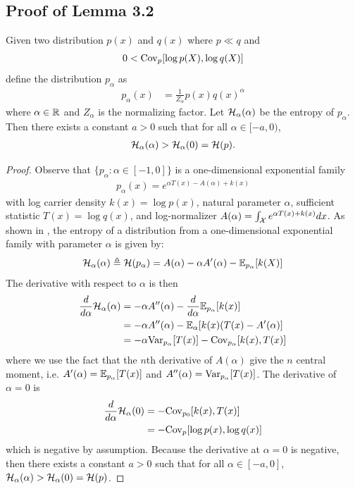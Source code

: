 \subsection{Proof of Lemma 3.2}\label{sec:covariance-proof}
\begin{lemma}\label{lemma:covariance-general}
Given two distribution $p(x)$ and $q(x)$ where $p \ll q$ and
\begin{align}
   0 < \mathrm{Cov}_p[\log p(X), \log q(X)]
\end{align}
define the distribution $p_\alpha$ as
\begin{align*}
    p_\alpha(x) &= \frac{1}{Z_\alpha} p(x) q(x)^\alpha
\end{align*}
where $\alpha \in \mathbb{R}$ and $Z_\alpha$ is the normalizing factor.
Let ${\mathcal{H}}_\alpha(\alpha)$ be the entropy of $p_\alpha$.
Then there exists a constant $a > 0$ such that for all $\alpha \in [-a, 0)$,
\begin{align}
    {\mathcal{H}}_\alpha(\alpha) > {\mathcal{H}}_\alpha(0) = {\mathcal{H}}(p).
\end{align}

\end{lemma}
\begin{proof}
Observe that $\{p_\alpha : \alpha \in [-1, 0]\}$ is a one-dimensional exponential family
\begin{align*}
    p_\alpha(x) = e^{\alpha T(x) - A(\alpha) + k(x)}
\end{align*}
with log carrier density $k(x) = \log p(x)$, natural parameter $\alpha$, sufficient statistic $T(x) = \log q(x)$, and log-normalizer $A(\alpha) = \int_{{\mathcal{X}}} e^{\alpha T(x) + k(x)}dx$.
As shown in \cite{nielsen2010entropies}, the entropy of a distribution from a one-dimensional exponential family with parameter $\alpha$ is given by:
\begin{align*}
    {\mathcal{H}}_\alpha(\alpha) \triangleq
    {\mathcal{H}}(p_\alpha)
    = A(\alpha) - \alpha A'(\alpha) - \mathbb{E}_{p_\alpha}[k(X)]
\end{align*}
The derivative with respect to $\alpha$ is then
\begin{align*}
    \frac{d}{d \alpha}{\mathcal{H}}_\alpha(\alpha)
        &= - \alpha A''(\alpha) - \frac{d}{d\alpha}\mathbb{E}_{p_\alpha}[k(x)]\\
        &= - \alpha A''(\alpha) - \mathbb{E}_\alpha[k(x)(T(x) - A'(\alpha)]\\
        &= - \alpha \mathrm{Var}_{p_\alpha}[T(x)] - \mathrm{Cov}_{p_\alpha}[k(x), T(x)]
\end{align*}
where we use the fact that the $n$th derivative of $A(\alpha)$ give the $n$ central moment, i.e. $A'(\alpha) = \mathbb{E}_{p_\alpha}[T(x)]$ and $A''(\alpha) = \mathrm{Var}_{p_\alpha}[T(x)]$.
The derivative of $\alpha = 0$ is
\begin{align*}
    \frac{d}{d \alpha}{\mathcal{H}}_\alpha(0)
        &= - \mathrm{Cov}_{p_0}[k(x), T(x)]\\
        &= - \mathrm{Cov}_p[\log p(x), \log q(x)]
\end{align*}
which is negative by assumption.
Because the derivative at $\alpha = 0$ is negative, then there exists a constant $a > 0$ such that for all $\alpha \in [-a, 0]$, ${\mathcal{H}}_\alpha(\alpha) > {\mathcal{H}}_\alpha(0) = {\mathcal{H}}(p)$.
\end{proof}
